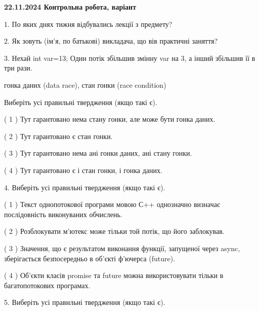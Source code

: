 \documentclass[12pt, ukrainian]{article}
\begin{document}
\vspace{4mm}
\newpage
\begin {large}

\textbf{22.11.2024 Контрольна робота, варіант  }\par


{
1. По яких днях тижня відбувались лекції з предмету?



\vspace{5mm}
2. Як зовуть (ім'я, по батькові) викладача, що вів практичні заняття?



\vspace{5mm}
3. Нехай int var=13; Один потік збільшив змінну var на 3, а інший збільшив її в три рази.

гонка даних (data race), стан гонки (race condition)

Виберіть усі правильні твердження (якщо такі є).\par
\vspace{2mm}
( 1 ) Тут гарантовано нема стану гонки, але може бути гонка даних.%

( 2 ) Тут гарантовано є стан гонки.%

( 3 ) Тут гарантовано нема ані гонки даних, ані стану гонки.%

( 4 ) Тут гарантовано є і стан гонки, і гонка даних.%


\vspace{5mm}
4. Виберіть усі правильні твердження (якщо такі є).\par
\vspace{2mm}

( 1 ) Текст однопотокової програми мовою С++ однозначно визначає послідовність виконуваних обчислень.%

( 2 ) Розблокувати м’ютекс може тільки той потік, що його заблокував.%

( 3 ) Значення, що є результатом виконання функції, запущеної через async, зберігається безпосередньо в об’єкті ф’ючерса (future).%

( 4 ) Об’єкти класів promise та future можна використовувати тільки в багатопотокових програмах.%


\vspace{5mm}
5. Виберіть усі правильні твердження (якщо такі є).\par
\vspace{2mm}

}
\end{large}
\end{document}
